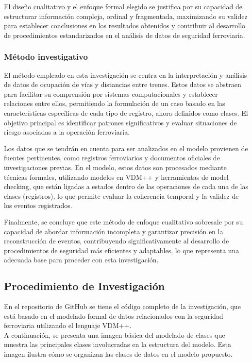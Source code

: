 \documentclass[journal]{IEEEtran}
\begin{document}
El diseño cualitativo y el enfoque formal elegido se justifica por su capacidad de estructurar información compleja, ordinal y fragmentada, maximizando su validez para establecer conclusiones en los resultados obtenidos y contribuir al desarrollo de procedimientos estandarizados en el análisis de datos de seguridad ferroviaria.  

\subsubsection*{Método investigativo}  
El método empleado en esta investigación se centra en la interpretación y análisis de datos de ocupación de vías y distancias entre trenes. Estos datos se abstraen para facilitar su comprensión por sistemas computacionales y establecer relaciones entre ellos, permitiendo la formulación de un caso basado en las características específicas de cada tipo de registro, ahora definidos como clases. El objetivo principal es identificar patrones significativos y evaluar situaciones de riesgo asociadas a la operación ferroviaria.  

Los datos que se tendrán en cuenta para ser analizados en el modelo provienen de fuentes pertinentes, como registros ferroviarios y documentos oficiales de investigaciones previas. En el modelo, estos datos son procesados mediante técnicas formales, utilizando modelos en VDM++ y herramientas de model checking, que están ligadas a estados dentro de las operaciones de cada una de las clases (registros), lo que permite evaluar la coherencia temporal y la validez de los eventos registrados.  

Finalmente, se concluye que este método de enfoque cualitativo sobresale por su capacidad de abordar información incompleta y garantizar precisión en la reconstrucción de eventos, contribuyendo significativamente al desarrollo de procedimientos de seguridad más eficientes y adaptables, lo que representa una adecuada base para proceder con esta investigación.  

\subsection*{Procedimiento de Investigación}  
En el repositorio de GitHub se tiene el código completo de la investigación, que está basado en el modelado formal de datos relacionados con la seguridad ferroviaria utilizando el lenguaje VDM++.\cite{rodrigostranger2023trafico_de_trenes}\\
A continuación, se presenta una imagen básica del modelado de clases que muestra las principales clases involucradas en la estructura del modelo. Esta imagen ilustra cómo se organizan las clases de datos en el modelo propuesto.  
\end{document}
